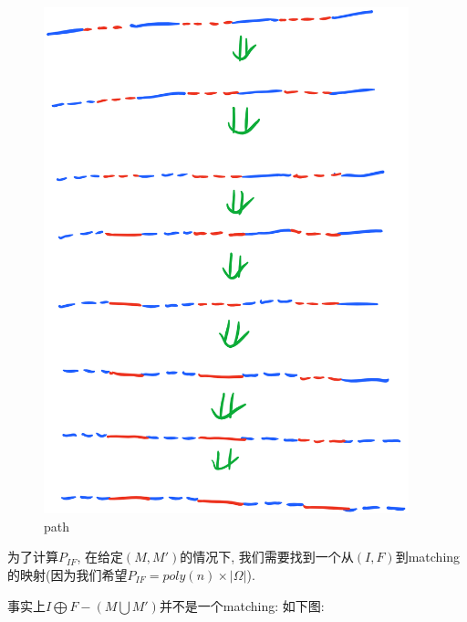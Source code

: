 \documentclass[paper=a4, fontsize=11pt]{scrartcl} %
\numberwithin{figure}{section} %
\numberwithin{table}{section} %
\begin{document}
	\begin{figure}[H]
	\centering
	\includegraphics[width=300pt]{pic3.png}
	\caption*{path}
	\end{figure}

	为了计算$P_{IF}$, 在给定$(M, M')$的情况下, 我们需要找到一个从$(I, F)$到matching的映射(因为我们希望$P_{IF}=poly(n)\times|\Omega|$).

	事实上$I\bigoplus F - (M\bigcup M')$并不是一个matching: 如下图:
	
\end{document}
